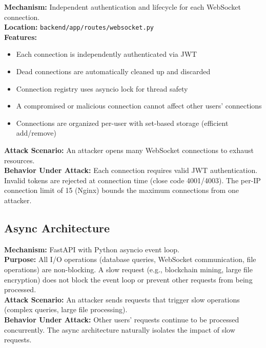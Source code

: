 \documentclass[11pt,a4paper]{article}
\begin{document}
\begin{tcolorbox}[colback=toleranceamber!5, colframe=toleranceamber]
\textbf{Mechanism:} Independent authentication and lifecycle for each WebSocket connection.\\
\textbf{Location:} \texttt{backend/app/routes/websocket.py}\\
\textbf{Features:}
\begin{itemize}[nosep]
  \item Each connection is independently authenticated via JWT
  \item Dead connections are automatically cleaned up and discarded
  \item Connection registry uses asyncio lock for thread safety
  \item A compromised or malicious connection cannot affect other users' connections
  \item Connections are organized per-user with set-based storage (efficient add/remove)
\end{itemize}
\textbf{Attack Scenario:} An attacker opens many WebSocket connections to exhaust resources.\\
\textbf{Behavior Under Attack:} Each connection requires valid JWT authentication. Invalid tokens are rejected at connection time (close code 4001/4003). The per-IP connection limit of 15 (Nginx) bounds the maximum connections from one attacker.
\end{tcolorbox}

\subsection{Async Architecture}

\begin{tcolorbox}[colback=toleranceamber!5, colframe=toleranceamber]
\textbf{Mechanism:} FastAPI with Python asyncio event loop.\\
\textbf{Purpose:} All I/O operations (database queries, WebSocket communication, file operations) are non-blocking. A slow request (e.g., blockchain mining, large file encryption) does not block the event loop or prevent other requests from being processed.\\
\textbf{Attack Scenario:} An attacker sends requests that trigger slow operations (complex queries, large file processing).\\
\textbf{Behavior Under Attack:} Other users' requests continue to be processed concurrently. The async architecture naturally isolates the impact of slow requests.
\end{tcolorbox}
\end{document}
